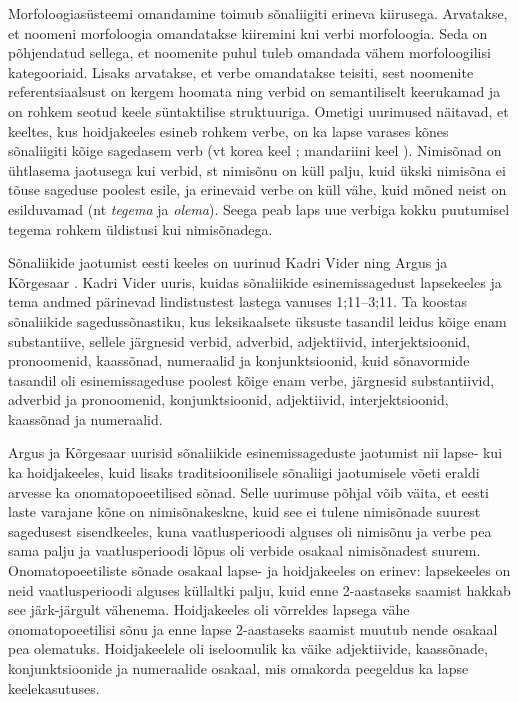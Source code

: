 \documentclass[12pt]{article}
\begin{document}
Morfoloogiasüsteemi omandamine toimub sõnaliigiti erineva kiirusega. Arvatakse, et noomeni morfoloogia omandatakse kiiremini kui verbi morfoloogia. Seda on põhjendatud sellega, et noomenite puhul tuleb omandada vähem morfoloogilisi kategooriaid. Lisaks arvatakse, et verbe omandatakse teisiti, sest noomenite referentsiaalsust on kergem hoomata ning verbid on semantiliselt keerukamad ja on rohkem seotud keele süntaktilise struktuuriga. \citep{Gentner} Ometigi uurimused näitavad, et keeltes, kus hoidjakeeles esineb rohkem verbe, on ka lapse varases kõnes sõnaliigiti kõige sagedasem verb (vt korea keel \citep{ChoiGopnik}; mandariini keel \citep{Tardif}). Nimisõnad on ühtlasema jaotusega kui verbid, st nimisõnu on küll palju, kuid ükski nimisõna ei tõuse sageduse poolest esile, ja erinevaid verbe on küll vähe, kuid mõned neist on esilduvamad (nt \emph{tegema} ja \emph{olema}). Seega peab laps uue verbiga kokku puutumisel tegema rohkem üldistusi kui nimisõnadega. \citep[38--39]{Argus_3}

Sõnaliikide jaotumist eesti keeles on uurinud Kadri Vider \citep{Vider} ning Argus ja Kõrgesaar \citep{Argus_3}. Kadri Vider uuris, kuidas sõnaliikide esinemissagedust lapsekeeles ja tema andmed pärinevad lindistustest lastega vanuses 1;11--3;11. Ta koostas sõnaliikide sagedussõnastiku, kus leksikaalsete üksuste tasandil leidus kõige enam substantiive, sellele järgnesid verbid, adverbid, adjektiivid, interjektsioonid, pronoomenid, kaassõnad, numeraalid ja konjunktsioonid, kuid sõnavormide tasandil oli esinemissageduse poolest kõige enam verbe, järgnesid substantiivid, adverbid ja pronoomenid, konjunktsioonid, adjektiivid, interjektsioonid, kaassõnad ja numeraalid. \citep{Vider}

Argus ja Kõrgesaar uurisid sõnaliikide esinemissageduste jaotumist nii lapse- kui ka hoidjakeeles, kuid lisaks traditsioonilisele sõnaliigi jaotumisele võeti eraldi arvesse ka onomatopoeetilised sõnad. Selle uurimuse põhjal võib väita, et eesti laste varajane kõne on nimisõnakeskne, kuid see ei tulene nimisõnade suurest sagedusest sisendkeeles, kuna vaatlusperioodi alguses oli nimisõnu ja verbe pea sama palju ja vaatlusperioodi lõpus oli verbide osakaal nimisõnadest suurem. Onomatopoeetiliste sõnade osakaal lapse- ja hoidjakeeles on erinev: lapsekeeles on neid vaatlusperioodi alguses küllaltki palju, kuid enne 2-aastaseks saamist hakkab see järk-järgult vähenema. Hoidjakeeles oli võrreldes lapsega vähe onomatopoeetilisi sõnu ja enne lapse 2-aastaseks saamist muutub nende osakaal pea olematuks. Hoidjakeelele oli iseloomulik ka väike adjektiivide, kaassõnade, konjunktsioonide ja numeraalide osakaal, mis omakorda peegeldus ka lapse keelekasutuses. \citep{Argus_3}
\end{document}
